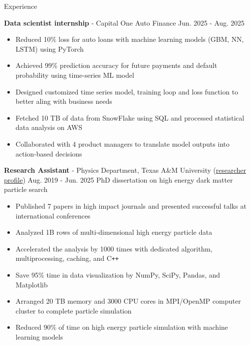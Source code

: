 \documentclass{resume}
\begin{document}
\begin{rSection}{Experience}
    \vspace{-1.5em}
    \item \textbf{Data scientist internship} - Capital One Auto Finance \hfill Jun. 2025 - Aug. 2025
        \begin{itemize}
        \item Reduced 10\% loss for auto loans with machine learning models (GBM, NN, LSTM) using PyTorch
        \item Achieved 99\% prediction accuracy for future payments and default probability using time-series ML model
        \item Designed customized time series model, training loop and loss function to better aling with business needs
        \item Fetched 10 TB of data from SnowFlake using SQL and processed statistical data analysis on AWS
        \item Collaborated with 4 product managers to translate model outputs into action-based decisions
        \end{itemize}

    \vspace{0.4em}
    \item \textbf{Research Assistant} - Physics Department, Texas A\&M University (\href{https://inspirehep.net/authors/2661451}{researcher profile}) \hfill Aug. 2019 - Jun. 2025
        \newline\hspace*{0.5em} {\normalsize PhD dissertation on high energy dark matter particle search}
        \begin{itemize}
        \item Published 7 papers in high impact journals and presented successful talks at international conferences
        \item Analyzed 1B rows of multi-dimensional high energy particle data
        \item Accelerated the analysis by 1000 times with dedicated algorithm, multiprocessing, caching, and C\texttt{++}
        \item Save 95\% time in data visualization by NumPy, SciPy, Pandas, and Matplotlib
        \item Arranged 20 TB memory and 3000 CPU cores in MPI/OpenMP computer cluster to complete particle simulation
        \item Reduced 90\% of time on high energy particle simulation with machine learning models
        \end{itemize}


\end{rSection}
\end{document}
